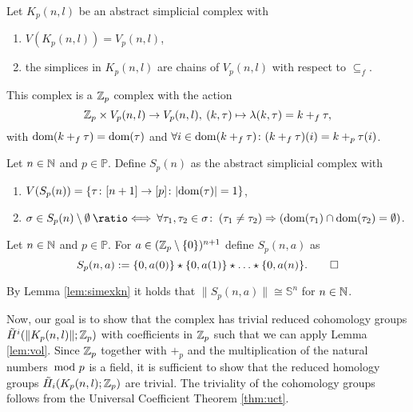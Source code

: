 \begin{defin}\label{defin:kpnl}
  Let $K_p(n,l)$ be an abstract simplicial complex with
  \begin{enumerate}[label=\roman*.)]
    \item $V(K_p(n,l)) = V_p(n,l)$,
    \item the simplices in $K_p(n,l)$ are chains of $V_p(n,l)$ with respect to $\subseteq_f$.
  \end{enumerate}
  This complex is a $\mathbb{Z}_p$ complex with the action
  \begin{equation*}
    \mathbb{Z}_p \times V_p(n,l) \to V_p(n,l), \: (k, \tau) \mapsto \lambda(k, \tau) = k +_f \tau,
  \end{equation*}
  with ${\rm dom}(k +_f \tau) = {\rm dom}(\tau)$ and $\forall i\in {\rm dom}(k +_f \tau)\colon (k+_f\tau)(i) = k +_p \tau(i)$.\qedhere
\end{defin}

\begin{defin}
  Let $n \in \mathbb{N}$ and $p \in \mathbb{P}$. Define $S_p(n)$ as the abstract simplicial complex with
  \begin{enumerate}[label=\roman*.)]
    \item $V(S_p(n)) = \{\tau\colon [n+1]\to [p]\colon |{\rm dom}(\tau)| = 1\}$,
    \item $\sigma \in S_p(n)\setminus\emptyset \: \longeq \: \forall \tau_1,\tau_2\in\sigma\colon \: (\tau_1 \neq \tau_2) \Rightarrow (\dom(\tau_1) \cap \dom(\tau_2) = \emptyset)$.\qedhere
  \end{enumerate}
\end{defin}

\begin{defin}
  Let $n \in \mathbb{N}$ and $p\in\mathbb{P}$. For $a \in (\mathbb{Z}_p\setminus\{0\})^{n+1}$ define $S_p(n,a)$ as
  \begin{equation*}
    S_p(n,a) := \{0, a(0)\} \star \{0,a(1)\} \star \ldots \star \{0,a(n)\}.\qedhere
  \end{equation*}
\end{defin}

\begin{rem}\label{rem:s}
  By Lemma \ref{lem:simexkn} it holds that $\lVert S_p(n,a) \rVert \cong \mathbb{S}^{n}$ for $n\in\mathbb{N}$.
\end{rem}

Now, our goal is to show that the complex has trivial reduced cohomology groups $\tilde{H}^i(\lVert K_p(n,l)\rVert; \mathbb{Z}_p)$ with coefficients in $\mathbb{Z}_p$ such that we can apply Lemma \ref{lem:vol}. Since $\mathbb{Z}_p$ together with $+_p$ and the multiplication of the natural numbers $\hspace*{-5px}\mod p$ is a field, it is sufficient to show that the reduced homology groups $\tilde{H}_i(K_p(n,l); \mathbb{Z}_p)$ are trivial. The triviality of the cohomology groups follows from the Universal Coefficient Theorem \ref{thm:uct}. 

